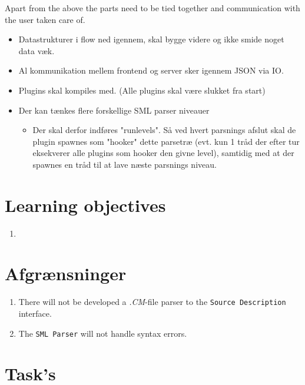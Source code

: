 \documentclass[a4paper,oneside]{memoir}
\begin{document}
Apart from the above the parts need to be tied together and communication with the user taken care
of.


\begin{itemize}
\item Datastrukturer i flow ned igennem, skal bygge videre og ikke smide noget
  data væk.

\item Al kommunikation mellem frontend og server sker igennem JSON via IO.

\item Plugins skal kompiles med. (Alle plugins skal være slukket fra start)


\item Der kan tænkes flere forskellige SML parser niveauer 
  \begin{itemize}

  \item Der skal derfor indføres "runlevels". Så ved hvert parsnings afslut skal
    de plugin spawnes som "hooker" dette parsetræ (evt. kun 1 tråd der efter tur
    eksekverer alle plugins som hooker den givne level), samtidig med at der
    spawnes en tråd til at lave næste parsnings niveau.
  \end{itemize}
\end{itemize}

\section{Learning objectives}

\begin{enumerate}
\item 
\end{enumerate}

\section{Afgrænsninger}


\begin{enumerate}
\item There will not be developed a \textit{.CM}-file parser to the
  \texttt{Source Description} interface.

\item The \texttt{SML Parser} will not handle syntax errors. 
\end{enumerate}


\section{Task's}
\end{document}
